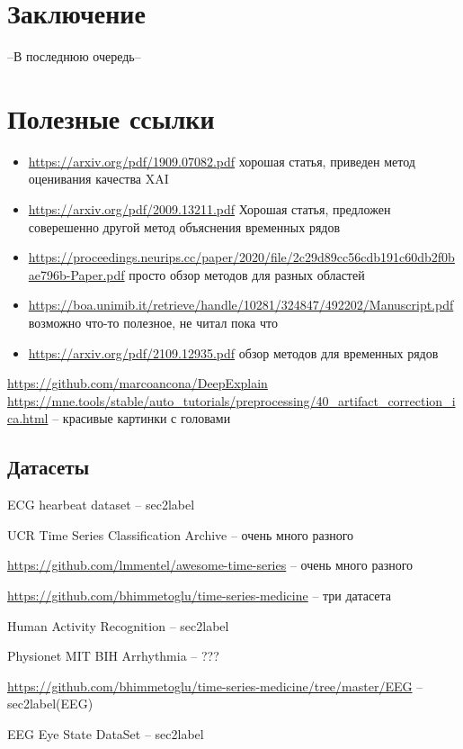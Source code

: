 \documentclass[12pt]{article}
\begin{document}
\section{Заключение}
--В последнюю очередь--

\section{Полезные ссылки}

\begin{itemize}
    \item \url{https://arxiv.org/pdf/1909.07082.pdf}  хорошая статья, приведен метод оценивания качества XAI
    \item \url{https://arxiv.org/pdf/2009.13211.pdf} Хорошая статья, предложен соверешенно другой метод объяснения временных рядов
    \item \url{https://proceedings.neurips.cc/paper/2020/file/2c29d89cc56cdb191c60db2f0bae796b-Paper.pdf} просто обзор методов для разных областей 

    \item \url{https://boa.unimib.it/retrieve/handle/10281/324847/492202/Manuscript.pdf} возможно что-то полезное, не читал пока что
    \item \url{https://arxiv.org/pdf/2109.12935.pdf} обзор методов для временных рядов
\end{itemize}

\url{https://github.com/marcoancona/DeepExplain}
\url{https://mne.tools/stable/auto_tutorials/preprocessing/40_artifact_correction_ica.html} -- красивые картинки с головами

\subsection{Датасеты}
 ECG hearbeat dataset -- sec2label
 
 UCR Time Series Classification Archive -- очень много разного
 
 \url{https://github.com/lmmentel/awesome-time-series} -- очень много разного
 
 \url{https://github.com/bhimmetoglu/time-series-medicine} -- три датасета
 
 Human Activity Recognition  -- sec2label
 
 Physionet MIT BIH Arrhythmia -- ???
 
 \url{https://github.com/bhimmetoglu/time-series-medicine/tree/master/EEG} -- sec2label(EEG)
 
 EEG Eye State DataSet -- sec2label
 
\end{document}
